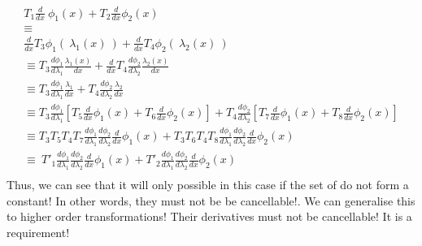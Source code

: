 \documentclass[11pt]{article}
\begin{document}
\begin{gather*}
T_{1}\frac{d}{dx} \ \phi _{1}( x) +T_{2}\frac{d}{dx} \phi _{2}( x)\\
\equiv \\
\frac{d}{dx} T_{3} \phi _{1}( \ \lambda _{1}( x) \ ) +\frac{d}{dx} T_{4} \phi _{2}( \ \lambda _{2}( x) \ )\\
\equiv T_{3}\frac{d\phi _{1}}{d\lambda _{1}}\frac{\lambda _{1}( x)}{dx} +\frac{d}{dx} T_{4}\frac{d\phi _{2}}{d\lambda _{2}}\frac{\lambda _{2}( x)}{dx}\\
\equiv T_{3}\frac{d\phi _{1}}{d\lambda _{1}}\frac{\lambda _{1}}{dx} +T_{4}\frac{d\phi _{2}}{d\lambda _{2}}\frac{\lambda _{2}}{dx}\\
\equiv T_{3}\frac{d\phi _{1}}{d\lambda _{1}}\left[ T_{5}\frac{d}{dx} \phi _{1}( x) +T_{6}\frac{d}{dx} \phi _{2}( x)\right] +T_{4}\frac{d\phi _{2}}{d\lambda _{2}}\left[ T_{7}\frac{d}{dx} \phi _{1}( x) +T_{8}\frac{d}{dx} \phi _{2}( x)\right]\\
\equiv T_{3} T_{5} T_{4} T_{7}\frac{d\phi _{1}}{d\lambda _{1}}\frac{d\phi _{2}}{d\lambda _{2}}\frac{d}{dx} \phi _{1}( x) +T_{3} T_{6} T_{4} T_{8}\frac{d\phi _{1}}{d\lambda _{1}}\frac{d\phi _{2}}{d\lambda _{2}}\frac{d}{dx} \phi _{2}( x)\\
\equiv \ T'_{1}\frac{d\phi _{1}}{d\lambda _{1}}\frac{d\phi _{2}}{d\lambda _{2}}\frac{d}{dx} \phi _{1}( x) +T'_{2}\frac{d\phi _{1}}{d\lambda _{1}}\frac{d\phi _{2}}{d\lambda _{2}}\frac{d}{dx} \phi _{2}( x)\\
\end{gather*}
Thus, we can see that it will only possible in this case if the set of do not form a constant!
In other words, they must not be be cancellable!. We can generalise this to higher order transformations! Their derivatives must not be cancellable! It is a requirement!



\end{document}
